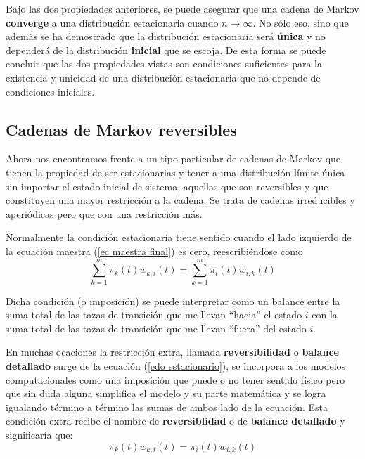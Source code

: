 \documentclass[12pt]{book}
\begin{document}
Bajo las dos propiedades anteriores, se puede asegurar que una cadena de Markov \textbf{converge} a una distribución estacionaria cuando $n \rightarrow \infty$. No sólo eso, sino que además se ha demostrado que la distribución estacionaria será \textbf{única} y no dependerá de la distribución \textbf{inicial} que se escoja. De esta forma se puede concluir que las dos propiedades vistas son condiciones suficientes para la existencia y unicidad de una distribución estacionaria que no depende de condiciones iniciales.

\subsection{Cadenas de Markov reversibles}

Ahora nos encontramos frente a un tipo particular de cadenas de Markov que tienen la propiedad de ser estacionarias y tener a una distribución límite única sin importar el estado inicial de sistema, aquellas que son reversibles y que constituyen una mayor restricción a la cadena. Se trata de cadenas irreducibles y aperiódicas pero que con una restricción más.

Normalmente la condición estacionaria tiene sentido cuando el lado izquierdo de la ecuación maestra (\ref{ec maestra final}) es cero, reescribiéndose como
\begin{equation}
	\boxed{ \sum_{k=1}^{m} \pi_{k}(t)  w_{k,i}(t)=\sum_{k=1}^{m} \pi_{i}(t)  w_{i,k}(t)} \label{edo estacionario}
\end{equation}

Dicha condición (o imposición) se puede interpretar como un balance entre la suma total de las tazas de transición que me llevan ``hacia'' el estado $i$ con la suma total de las tazas de transición que me llevan ``fuera'' del estado $i$.

En muchas ocaciones la restricción extra, llamada \textbf{reversibilidad} o \textbf{balance detallado} surge de la ecuación (\ref{edo estacionario}), se incorpora a los modelos computacionales como una imposición que puede o no tener sentido físico pero que sin duda alguna simplifica el modelo y su parte matemática y se logra igualando término a término las sumas de ambos lado de la ecuación. Esta condición extra recibe el nombre de \textbf{reversiblidad} o de \textbf{balance detallado} y significaría que:
\begin{equation}
	\boxed{  \pi_{k}(t)  w_{k,i}(t)= \pi_{i}(t)  w_{i,k}(t)}
\end{equation}
\end{document}

